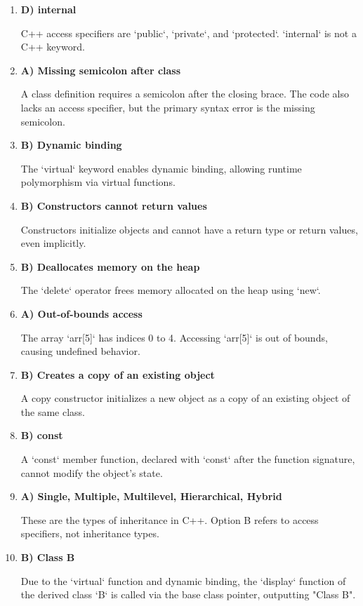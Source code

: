 \documentclass[a4paper,12pt]{article}
\begin{document}
\begin{enumerate}
    \item \textbf{D) internal}

    C++ access specifiers are `public`, `private`, and `protected`. `internal` is not a C++ keyword.

    \item \textbf{A) Missing semicolon after class}

    A class definition requires a semicolon after the closing brace. The code also lacks an access specifier, but the primary syntax error is the missing semicolon.

    \item \textbf{B) Dynamic binding}

    The `virtual` keyword enables dynamic binding, allowing runtime polymorphism via virtual functions.

    \item \textbf{B) Constructors cannot return values}

    Constructors initialize objects and cannot have a return type or return values, even implicitly.

    \item \textbf{B) Deallocates memory on the heap}

    The `delete` operator frees memory allocated on the heap using `new`.

    \item \textbf{A) Out-of-bounds access}

    The array `arr[5]` has indices 0 to 4. Accessing `arr[5]` is out of bounds, causing undefined behavior.

    \item \textbf{B) Creates a copy of an existing object}

    A copy constructor initializes a new object as a copy of an existing object of the same class.

    \item \textbf{B) const}

    A `const` member function, declared with `const` after the function signature, cannot modify the object’s state.

    \item \textbf{A) Single, Multiple, Multilevel, Hierarchical, Hybrid}

    These are the types of inheritance in C++. Option B refers to access specifiers, not inheritance types.

    \item \textbf{B) Class B}

    Due to the `virtual` function and dynamic binding, the `display` function of the derived class `B` is called via the base class pointer, outputting "Class B".
\end{enumerate}
\end{document}
